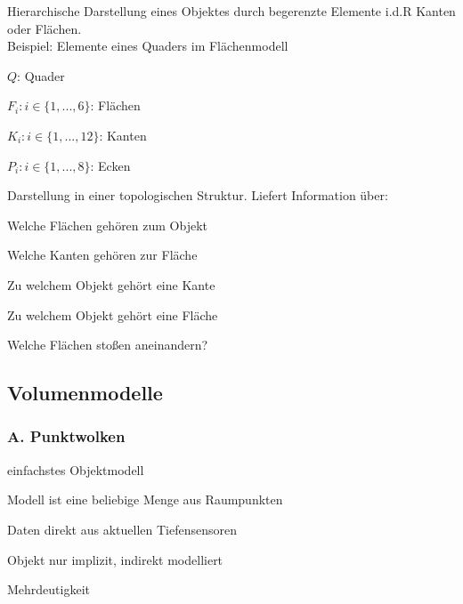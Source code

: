 Hierarchische Darstellung eines Objektes durch begerenzte Elemente i.d.R Kanten oder Flächen. \\
Beispiel: Elemente eines Quaders im Flächenmodell
\begin{compactitem}
    \item $Q$: Quader
    \item $F_i : i \in \{1,...,6\}$: Flächen
    \item $K_i : i \in \{1,...,12\}$: Kanten
    \item $P_i : i \in \{1,...,8\}$: Ecken
\end{compactitem}
Darstellung in einer topologischen Struktur. Liefert Information über:
\begin{compactitem}
    \item Welche Flächen gehören zum Objekt
    \item Welche Kanten gehören zur Fläche
    \item Zu welchem Objekt gehört eine Kante
    \item Zu welchem Objekt gehört eine Fläche
    \item Welche Flächen stoßen aneinandern?
\end{compactitem}
\subsection{Volumenmodelle}
\subsubsection{A. Punktwolken}
\begin{compactitem}
    \item einfachstes Objektmodell
    \item Modell ist eine beliebige Menge aus Raumpunkten
    \item Daten direkt aus aktuellen Tiefensensoren
    \item Objekt nur implizit, indirekt modelliert
    \item Mehrdeutigkeit
\end{compactitem}
